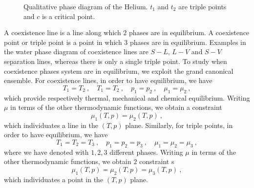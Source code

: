     \begin{figure}[h!]
        \centering
        \caption{Qualitative phase diagram of the Helium. $t_1$ and $t_2$ are triple points and $c$ is a critical point.}
        \label{fig:phhelium}
    \end{figure} 

    A coexistence line is a line along which $2$ phases are in equilibrium. A coexistence point or triple point is a point in which $3$ phases are in equilibrium. Examples in the water phase diagram of coexistence lines are $S-L$, $L-V$ and $S-V$ separation lines, whereas there is only a single triple point. To study when coexistence phases system are in equilibrium, we exploit the grand canonical ensemble. For coexistence lines, in order to have equilibrium, we have
    \begin{equation*}
        T_1 = T_2 ~, \quad T_1 = T_2 ~, \quad p_1 = p_2 ~, \quad \mu_1 = \mu_2 ~,
    \end{equation*}
    which provide respectively thermal, mechanical and chemical equilibrium. Writing $\mu$ in terms of the other thermodynamic functions, we obtain a constraint 
    \begin{equation*}
        \mu_1(T,p) = \mu_2(T,p) ~,
    \end{equation*}
    which individuates a line in the $(T, p)$ plane. Similarly, for triple points, in order to have equilibrium, we have
    \begin{equation*}
        T_1 = T_2 = T_3 ~, \quad p_1 = p_2 = p_3 ~, \quad \mu_1 = \mu_2 = \mu_3 ~,
    \end{equation*}
    where we have denoted with $1,2,3$ different phases. Writing $\mu$ in terms of the other thermodynamic functions, we obtain $2$ constraint s
    \begin{equation*}
        \mu_1(T,p) = \mu_2(T,p) = \mu_3(T,p) ~,
    \end{equation*}
    which individuates a point in the $(T, p)$ plane.

